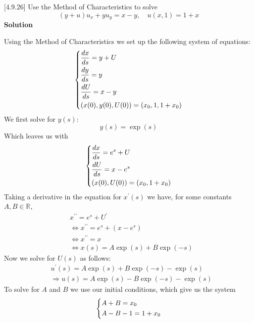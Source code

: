 \documentclass{article}
\begin{document}
\vspace{5mm}

[4.9.26] Use the Method of Characteristics to solve
%
\begin{equation*}
    (y + u) u_x + y u_y = x - y, \quad u(x, 1) = 1 + x
\end{equation*}
%
\textbf{Solution}

Using the Method of Characteristics we set up the following system of
equations:
%
\begin{equation*}
    \begin{dcases}
        \frac{d x}{d s} = y + U \\
        \frac{d y}{d s} = y \\
        \frac{d U}{d s} = x - y \\
        \left( x(0), y(0), U(0)\right) = \left( x_0, 1, 1 + x_0 \right)
    \end{dcases}
\end{equation*}
%
We first solve for $y(s)$:
%
\begin{equation*}
    y(s) = \exp(s)
\end{equation*}
%
Which leaves us with
%
\begin{equation*}
    \begin{dcases}
        \frac{d x}{d s} = e^s + U \\
        \frac{d U}{d s} = x - e^s \\
        \left( x(0), U(0)\right) = \left( x_0, 1 + x_0 \right)
    \end{dcases}
\end{equation*}
%
Taking a derivative in the equation for $x^{\prime}(s)$ we have, for
some constants $A, B \in \mathbb{R}$,
%
\begin{align*}
    &x^{\prime \prime} = e^s + U^{\prime} \\
    &\iff x^{\prime \prime} = e^s + \left(x - e^s\right) \\
    &\iff x^{\prime \prime} = x \\
    &\iff x(s) = A \exp(s) + B \exp(-s)
\end{align*}
%
Now we solve for $U(s)$ as follows:
%
\begin{align*}
    &u^{\prime}(s) = A \exp(s) + B \exp(-s) - \exp(s) \\
    &\Rightarrow u(s) = A \exp(s) - B \exp(-s) - \exp(s)
\end{align*}
%
To solve for $A$ and $B$ we use our initial conditions, which give us
the system
%
\begin{equation*}
    \begin{dcases}
        A + B = x_0 \\
        A - B - 1 = 1 + x_0
    \end{dcases}
\end{equation*}
\end{document}

